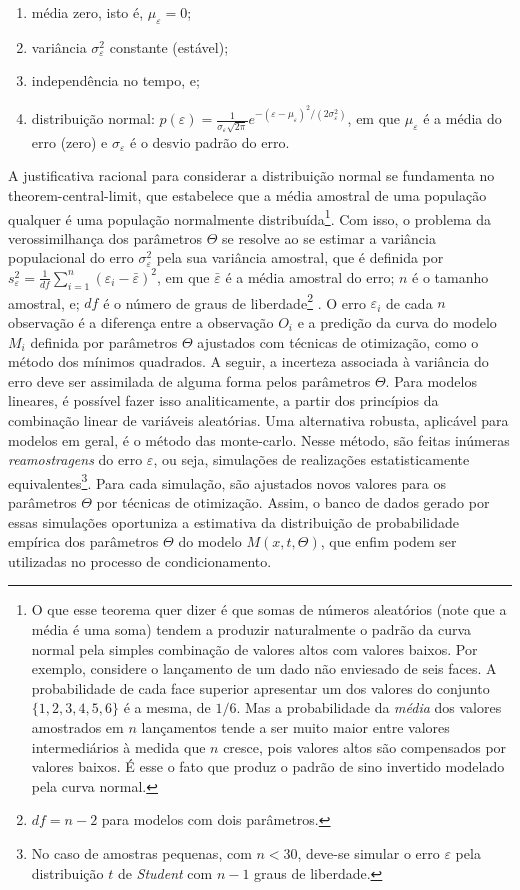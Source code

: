\documentclass[./main.tex]{subfiles}
\begin{document}
\begin{enumerate}
    \item média zero, isto é, $\mu_{\varepsilon} = 0$;
    \item variância $\sigma_{\varepsilon}^2$ constante (estável);
    \item independência no tempo, e;
    \item distribuição normal: $p(\varepsilon) = \frac{1}{\sigma_{\varepsilon} \sqrt{2\pi}}e^{-(\varepsilon-\mu_{\varepsilon})^2/{(2\sigma_{\varepsilon}^2)}}$, em que $\mu_{\varepsilon}$ é a média do erro (zero) e $\sigma_{\varepsilon}$ é o desvio padrão do erro.
\end{enumerate}
A justificativa racional para considerar a distribuição normal se fundamenta no \gls{theorem-central-limit}, que estabelece que a média amostral de uma população qualquer é uma população normalmente distribuída\footnote{O que esse teorema quer dizer é que somas de números aleatórios (note que a média é uma soma) tendem a produzir naturalmente o padrão da curva normal pela simples combinação de valores altos com valores baixos. Por exemplo, considere o lançamento de um dado não enviesado de seis faces. A probabilidade de cada face superior apresentar um dos valores do conjunto $\{1, 2, 3, 4, 5, 6\}$ é a mesma, de $1/6$. Mas a probabilidade da \textit{média} dos valores amostrados em $n$ lançamentos tende a ser muito maior entre valores intermediários à medida que $n$ cresce, pois valores altos são compensados por valores baixos. É esse o fato que produz o padrão de sino invertido modelado pela curva normal.}. Com isso, o problema da verossimilhança dos parâmetros $\Theta$ se resolve ao se estimar a variância populacional do erro $\sigma^2_\varepsilon$ pela sua variância amostral, que é definida por $s^2_{\varepsilon} = \frac{1}{df}\sum_{i=1}^{n}({\varepsilon_i - \bar{\varepsilon}})^2$, em que $\bar{\varepsilon}$ é a média amostral do erro; $n$ é o tamanho amostral, e; $df$ é o número de graus de liberdade\footnote{$df = n-2$ para modelos com dois parâmetros.} \cite{graybill1994}. O erro $\varepsilon_i$ de cada $n$ observação é a diferença entre a observação $O_i$ e a predição da curva do modelo $M_i$ definida por parâmetros $\Theta$ ajustados com técnicas de otimização, como o método dos mínimos quadrados. A seguir, a incerteza associada à variância do erro deve ser assimilada de alguma forma pelos parâmetros $\Theta$. Para modelos lineares, é possível fazer isso analiticamente, a partir dos princípios da combinação linear de variáveis aleatórias. Uma alternativa robusta, aplicável para modelos em geral, é o método das \gls{monte-carlo}. Nesse método, são feitas inúmeras \textit{reamostragens} do erro $\varepsilon$, ou seja, simulações de realizações estatisticamente equivalentes\footnote{No caso de amostras pequenas, com $n < 30$, deve-se simular o erro $\varepsilon$ pela distribuição $t$ de \textit{Student} com $n-1$ graus de liberdade.}. Para cada simulação, são ajustados novos valores para os parâmetros $\Theta$ por técnicas de otimização. Assim, o banco de dados gerado por essas simulações oportuniza a estimativa da distribuição de probabilidade empírica dos parâmetros $\Theta$ do modelo $M(x, t, \Theta)$, que enfim podem ser utilizadas no processo de condicionamento. 
\end{document}
